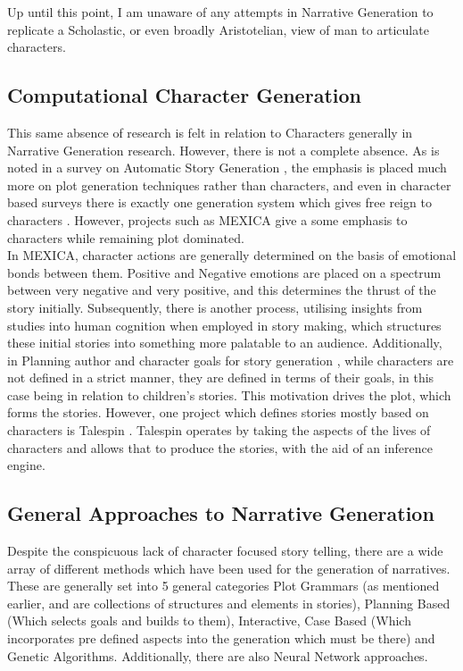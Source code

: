 \documentclass[11pt]{article}
\begin{document}
Up until this point, I am unaware of any attempts in Narrative Generation to replicate a Scholastic, or even broadly Aristotelian, view of man to articulate characters.


\subsection{Computational Character Generation}
This same absence of research is felt in relation to Characters generally in Narrative Generation research. However, there is not a complete absence. As is noted in a survey on Automatic Story Generation \cite{AutomaticStoryGeneration2021}, the emphasis is placed much more on plot generation techniques rather than characters, and even in character based surveys there is exactly one generation system which gives free reign to characters \cite{Riedl2003CharacterfocusedNP}. However, projects such as MEXICA\cite{MEXICA} give a some emphasis to characters while remaining plot dominated.\\

In MEXICA, character actions are generally determined on the basis of emotional bonds between them. Positive and Negative emotions are placed on a spectrum between very negative and very positive, and this determines the thrust of the story initially. Subsequently, there is another process, utilising insights from studies into human cognition when employed in story making, which structures these initial stories into something more palatable to an audience. Additionally, in Planning author and character goals for story generation \cite{authorandcharactergoals}, while characters are not defined in a strict manner, they are defined in terms of their goals, in this case being in relation to children's stories. This motivation drives the plot, which forms the stories. However, one project which defines stories mostly based on characters is Talespin \cite{Meehan1977TALESPINAI}. Talespin operates by taking the aspects of the lives of characters and allows that to produce the stories, with the aid of an inference engine.\\  
\subsection{General Approaches to Narrative Generation}
Despite the conspicuous lack of character focused story telling, there are a wide array of different methods which have been used for the generation of narratives. These are generally set into 5 general categories \cite{KybartasGenerationTechniques} \: Plot Grammars (as mentioned earlier, and are collections of structures and elements in stories), Planning Based (Which selects goals and builds to them), Interactive, Case Based (Which incorporates pre defined aspects into the generation which must be there) and Genetic Algorithms. Additionally, there are also Neural Network approaches. 
\end{document}
